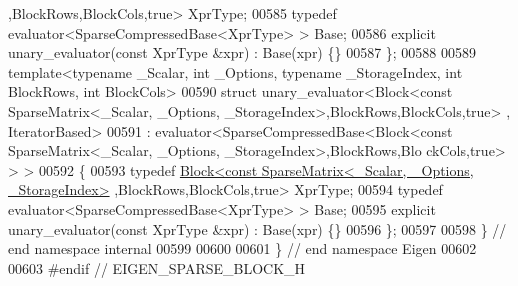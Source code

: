\begin{DoxyCode}
      ,BlockRows,BlockCols,\textcolor{keyword}{true}> XprType;
00585   \textcolor{keyword}{typedef} evaluator<SparseCompressedBase<XprType> > Base;
00586   \textcolor{keyword}{explicit} unary\_evaluator(\textcolor{keyword}{const} XprType &xpr) : Base(xpr) \{\}
00587 \};
00588 
00589 \textcolor{keyword}{template}<\textcolor{keyword}{typename} \_Scalar, \textcolor{keywordtype}{int} \_Options, \textcolor{keyword}{typename} \_StorageIndex, \textcolor{keywordtype}{int} BlockRows, \textcolor{keywordtype}{int} BlockCols>
00590 \textcolor{keyword}{struct }unary\_evaluator<Block<const SparseMatrix<\_Scalar, \_Options, \_StorageIndex>,BlockRows,BlockCols,true>
      , IteratorBased>
00591   : evaluator<SparseCompressedBase<Block<const SparseMatrix<\_Scalar, \_Options, \_StorageIndex>,BlockRows,Blo
      ckCols,true> > >
00592 \{
00593   \textcolor{keyword}{typedef} \hyperlink{group___core___module_class_eigen_1_1_block}{Block<const SparseMatrix<\_Scalar, \_Options, \_StorageIndex>}
      ,BlockRows,BlockCols,\textcolor{keyword}{true}> XprType;
00594   \textcolor{keyword}{typedef} evaluator<SparseCompressedBase<XprType> > Base;
00595   \textcolor{keyword}{explicit} unary\_evaluator(\textcolor{keyword}{const} XprType &xpr) : Base(xpr) \{\}
00596 \};
00597 
00598 \} \textcolor{comment}{// end namespace internal}
00599 
00600 
00601 \} \textcolor{comment}{// end namespace Eigen}
00602 
00603 \textcolor{preprocessor}{#endif // EIGEN\_SPARSE\_BLOCK\_H}
\end{DoxyCode}
